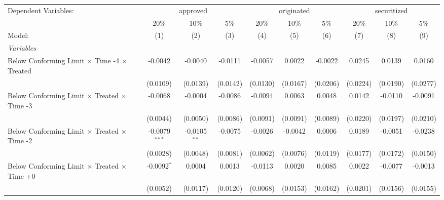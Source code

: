 \begingroup
\centering
\begin{tabular}{lccccccccc}
   \tabularnewline \midrule \midrule
   Dependent Variables: & \multicolumn{3}{c}{approved} & \multicolumn{3}{c}{originated} & \multicolumn{3}{c}{securitized}\\
                                                              & 20\%            & 10\%           & 5\%           & 20\%      & 10\%          & 5\%           & 20\%          & 10\%          & 5\% \\    
   Model:                                                     & (1)             & (2)            & (3)           & (4)       & (5)           & (6)           & (7)           & (8)           & (9)\\  
   \midrule
   \emph{Variables}\\
   Below Conforming Limit $\times$ Time -4 $\times$ Treated   & -0.0042         & -0.0040        & -0.0111       & -0.0057   & 0.0022        & -0.0022       & 0.0245        & 0.0139        & 0.0160\\   
                                                              & (0.0109)        & (0.0139)       & (0.0142)      & (0.0130)  & (0.0167)      & (0.0206)      & (0.0224)      & (0.0190)      & (0.0277)\\   
   Below Conforming Limit $\times$ Treated $\times$ Time -3   & -0.0068         & -0.0004        & -0.0086       & -0.0094   & 0.0063        & 0.0048        & 0.0142        & -0.0110       & -0.0091\\   
                                                              & (0.0044)        & (0.0050)       & (0.0086)      & (0.0091)  & (0.0091)      & (0.0089)      & (0.0220)      & (0.0197)      & (0.0210)\\   
   Below Conforming Limit $\times$ Treated $\times$ Time -2   & -0.0079$^{***}$ & -0.0105$^{**}$ & -0.0075       & -0.0026   & -0.0042       & 0.0006        & 0.0189        & -0.0051       & -0.0238\\   
                                                              & (0.0028)        & (0.0048)       & (0.0081)      & (0.0062)  & (0.0076)      & (0.0119)      & (0.0177)      & (0.0172)      & (0.0150)\\   
   Below Conforming Limit $\times$ Treated $\times$ Time +0   & -0.0092$^{*}$   & 0.0004         & 0.0013        & -0.0113   & 0.0020        & 0.0085        & 0.0022        & -0.0077       & -0.0013\\   
                                                              & (0.0052)        & (0.0117)       & (0.0120)      & (0.0068)  & (0.0153)      & (0.0162)      & (0.0201)      & (0.0156)      & (0.0155)\\   

\end{tabular}
